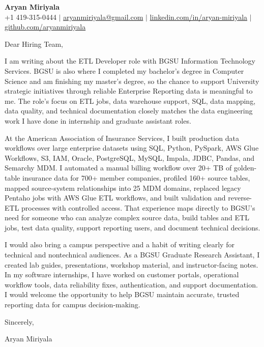 \documentclass[letterpaper,11pt]{article}
\begin{document}
\begin{center}
  {\Large \textbf{Aryan Miriyala}}\\[-1pt]
  \small
  +1 419-315-0444 $|$
  \href{mailto:aryanmiriyala@gmail.com}{aryanmiriyala@gmail.com} $|$
  \href{https://www.linkedin.com/in/aryan-miriyala-7788a21b6/}{linkedin.com/in/aryan-miriyala} $|$
  \href{https://github.com/aryanmiriyala}{github.com/aryanmiriyala}
\end{center}

\vspace{8pt}

Dear Hiring Team,

I am writing about the ETL Developer role with BGSU Information Technology Services. BGSU is also where I completed my bachelor's degree in Computer Science and am finishing my master's degree, so the chance to support University strategic initiatives through reliable Enterprise Reporting data is meaningful to me. The role's focus on ETL jobs, data warehouse support, SQL, data mapping, data quality, and technical documentation closely matches the data engineering work I have done in internship and graduate assistant roles.

At the American Association of Insurance Services, I built production data workflows over large enterprise datasets using SQL, Python, PySpark, AWS Glue Workflows, S3, IAM, Oracle, PostgreSQL, MySQL, Impala, JDBC, Pandas, and Semarchy MDM. I automated a manual billing workflow over 20+ TB of golden-table insurance data for 700+ member companies, profiled 160+ source tables, mapped source-system relationships into 25 MDM domains, replaced legacy Pentaho jobs with AWS Glue ETL workflows, and built validation and reverse-ETL processes with controlled access. That experience maps directly to BGSU's need for someone who can analyze complex source data, build tables and ETL jobs, test data quality, support reporting users, and document technical decisions.

I would also bring a campus perspective and a habit of writing clearly for technical and nontechnical audiences. As a BGSU Graduate Research Assistant, I created lab guides, presentations, workshop material, and instructor-facing notes. In my software internships, I have worked on customer portals, operational workflow tools, data reliability fixes, authentication, and support documentation. I would welcome the opportunity to help BGSU maintain accurate, trusted reporting data for campus decision-making.

Sincerely,

Aryan Miriyala
\end{document}
